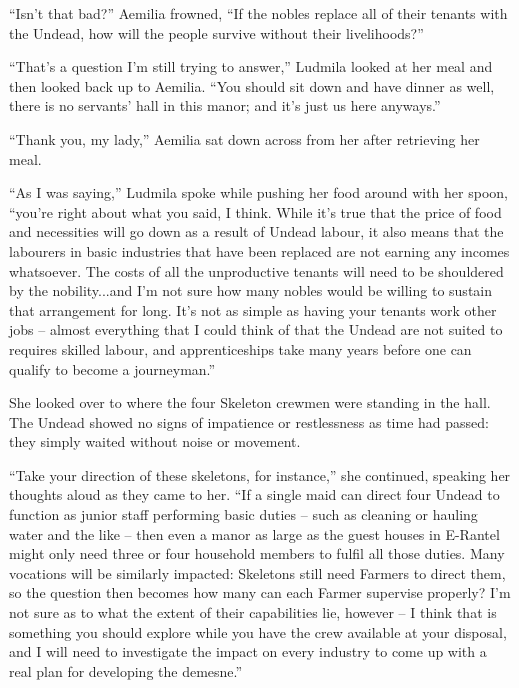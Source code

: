  

“Isn’t that bad?” Aemilia frowned, “If the nobles replace all of their tenants with the Undead, how will the people survive without their livelihoods?”

 

“That’s a question I’m still trying to answer,” Ludmila looked at her meal and then looked back up to Aemilia. “You should sit down and have dinner as well, there is no servants’ hall in this manor; and it’s just us here anyways.”

 

“Thank you, my lady,” Aemilia sat down across from her after retrieving her meal.

 

“As I was saying,” Ludmila spoke while pushing her food around with her spoon, “you’re right about what you said, I think. While it’s true that the price of food and necessities will go down as a result of Undead labour, it also means that the labourers in basic industries that have been replaced are not earning any incomes whatsoever. The costs of all the unproductive tenants will need to be shouldered by the nobility...and I’m not sure how many nobles would be willing to sustain that arrangement for long. It’s not as simple as having your tenants work other jobs – almost everything that I could think of that the Undead are not suited to requires skilled labour, and apprenticeships take many years before one can qualify to become a journeyman.”

 

She looked over to where the four Skeleton crewmen were standing in the hall. The Undead showed no signs of impatience or restlessness as time had passed: they simply waited without noise or movement.

 

“Take your direction of these skeletons, for instance,” she continued, speaking her thoughts aloud as they came to her. “If a single maid can direct four Undead to function as junior staff performing basic duties – such as cleaning or hauling water and the like – then even a manor as large as the guest houses in E-Rantel might only need three or four household members to fulfil all those duties. Many vocations will be similarly impacted: Skeletons still need Farmers to direct them, so the question then becomes how many can each Farmer supervise properly? I’m not sure as to what the extent of their capabilities lie, however – I think that is something you should explore while you have the crew available at your disposal, and I will need to investigate the impact on every industry to come up with a real plan for developing the demesne.”


